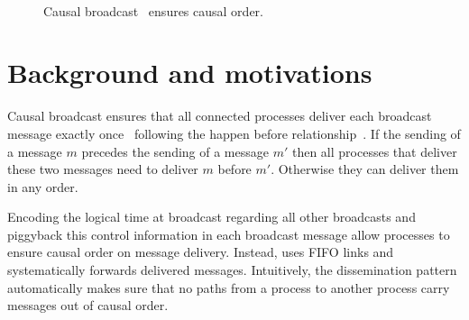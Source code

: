 
\begin{figure*}
  \begin{center}
    \hspace{40pt}
    \hspace{40pt}
    \\
    \hspace{40pt}
    \caption{\label{fig:generalsolve}Causal broadcast~\cite{friedman2004causal}
      ensures causal order.}
  \end{center}
\end{figure*}


\section{Background and motivations}
\label{sec:motivations}

Causal broadcast ensures that all connected processes deliver each broadcast
message exactly once~\cite{hadzilacos1994modular} following the happen before
relationship~\cite{lamport1978time}. If the sending of a message $m$ precedes
the sending of a message $m'$ then all processes that deliver these two messages
need to deliver $m$ before $m'$. Otherwise they can deliver them in any order.

Encoding the logical time at broadcast regarding all other broadcasts and
piggyback this control information in each broadcast message allow processes to
ensure causal order on message delivery. Instead, \cite{friedman2004causal}
uses FIFO links and systematically forwards delivered messages.  Intuitively,
the dissemination pattern automatically makes sure that no paths from a process
to another process carry messages out of causal order.

